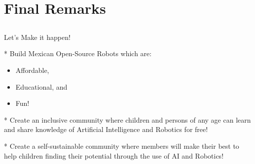 \documentclass[compress]{beamer}
\begin{document}
\subsection{}

%
%
%
%




\section{Final Remarks}

\subsection{}
{
\begin{frame}{Let's Make it happen!}

* Build Mexican Open-Source Robots which are:
\begin{itemize}
        \item Affordable, 
	\item Educational, and 
	\item Fun!
\end{itemize}

* Create an inclusive community where children and persons of any age can
learn and share knowledge of Artificial Intelligence and
Robotics for free!

* Create a self-sustainable community where
members will make their best to help 
children finding their potential 
through the use of AI and Robotics! 

\end{frame}
}











\section{}
\end{document}
